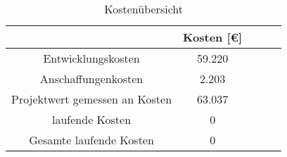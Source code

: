 \begin{table}[h]
\centering
\begin{tabular}{ccccl}
\hline
\multicolumn{1}{l}{}            & Kosten {[}€{]}  & \\ \hline
Entwicklungskosten              & 59.220          & \\ \hline
Anschaffungenkosten             & 2.203           & \\ \hline
Projektwert gemessen an Kosten  & 63.037          & \\ \hline
laufende Kosten                 & 0               & \\ \hline
Gesamte laufende Kosten         & 0               & \\ \hline
\end{tabular}
\caption{Kostenübersicht}%
\label{tab:Kostenuebersicht}%
\end{table}